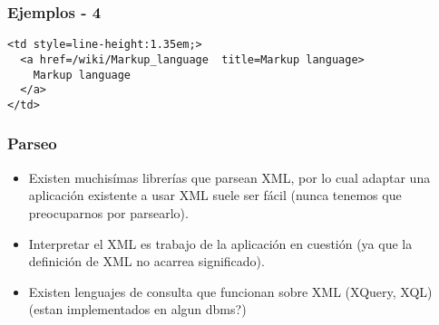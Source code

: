 \begin{frame}
\frametitle{Ejemplos - 4}
\footnotesize
\texttt{<td style=\dquote line-height:1.35em;\dquote>		\\
	~~<a href=\dquote /wiki/Markup\_language\dquote ~
		title=\dquote Markup language\dquote>		\\
	~~~~Markup language					\\
	~~</a>							\\
	</td>
}
\end{frame}

\begin{frame}
\frametitle{Parseo}
\begin{itemize}
	\item	Existen muchisímas librerías que parsean XML, por lo cual
		adaptar una aplicación existente a usar XML suele ser fácil
		(nunca tenemos que preocuparnos por parsearlo).
		\pause

	\item	Interpretar el XML es trabajo de la aplicación en cuestión
		(ya que la definición de XML no acarrea significado).
		\pause

	\item	Existen lenguajes de consulta que funcionan sobre XML
		(XQuery, XQL) (estan implementados en algun dbms?)
\end{itemize}
\end{frame}
